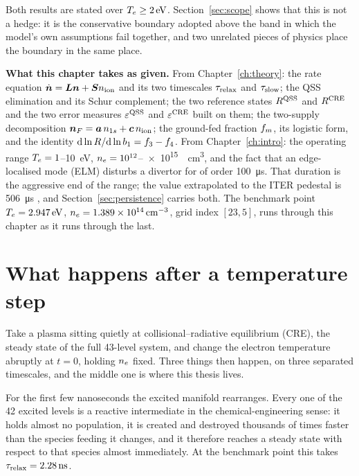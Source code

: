 Both results are stated over $T_e\ge\SI{2}{\electronvolt}$.
Section~\ref{sec:scope} shows that this is not a hedge: it is the conservative
boundary adopted above the band in which the model's own assumptions fail
together, and two unrelated pieces of physics place the boundary in the same
place.

\medskip
\noindent\textbf{What this chapter takes as given.} From
Chapter~\ref{ch:theory}: the rate equation
$\dot{\bm{n}} = \bm{L}\bm{n} + \bm{S}n_{\mathrm{ion}}$ and its two timescales
$\tau_{\mathrm{relax}}$ and $\tau_{\mathrm{slow}}$; the QSS elimination and its Schur complement; the two
reference states $R^{\mathrm{QSS}}$ and $R^{\mathrm{CRE}}$ and the two error measures
$\varepsilon^{\mathrm{QSS}}$ and $\varepsilon^{\mathrm{CRE}}$ built on them; the two-supply decomposition
$\bm{n}_{F} = \bm{a}\,n_{1s} + \bm{c}\,n_{\mathrm{ion}}$; the ground-fed fraction $f_{m}$, its
logistic form, and the identity
$\mathrm{d}\ln R/\mathrm{d}\ln b_1 = f_{3}-f_{4}$. From
Chapter~\ref{ch:intro}: the operating range
$T_e = 1$--\SI{10}{\electronvolt}, $n_e =
10^{12}$--\SI{e15}{\per\cubic\centi\metre}, and the fact that an edge-localised
mode (ELM) disturbs a divertor for of order \SI{100}{\micro\second}. That
duration is the aggressive end of the range; the value extrapolated to the ITER
pedestal is \SI{506}{\micro\second} \cite[Sec.~5]{Loarte2003}, and
Section~\ref{sec:persistence} carries both.
The benchmark point $T_e = \SI{2.947}{\electronvolt}$, $n_e = \SI{1.389e14}{\per\cubic\centi\metre}$, grid index $[23,5]$,
runs through this chapter as it runs through the last.

\section{What happens after a temperature step}
\label{sec:step_response}

Take a plasma sitting quietly at collisional--radiative equilibrium (CRE), the
steady state of the full 43-level system, and change the electron temperature
abruptly at $t=0$, holding $n_e$ fixed. Three things then happen, on three
separated timescales, and the middle one is where this thesis lives.

For the first few nanoseconds the excited manifold rearranges. Every one of the
42 excited levels is a reactive intermediate in the chemical-engineering sense:
it holds almost no population, it is created and destroyed thousands of times
faster than the species feeding it changes, and it therefore reaches a
steady state with respect to that species almost immediately. At the benchmark
point this takes $\tau_{\mathrm{relax}} = \SI{2.28}{\nano\second}$.

